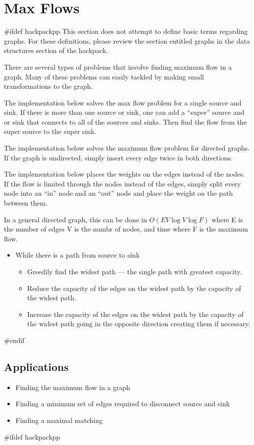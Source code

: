 \section{Max Flows}
#ifdef hackpackpp
This section does not attempt to define basic terms regarding graphs.
For these definitions, please review the section entitled graphs in the data structures section of the hackpack.


There are several types of problems that involve finding maximum flow in a graph.
Many of these problems can easily tackled by making small transformations to the graph.


The implementation below solves the max flow problem for a single source and sink.
If there is more than one source or sink, one can add a ``super'' source and or sink that connects to all of the sources and sinks.
Then find the flow from the super source to the super sink.


The implementation below solves the maximum flow problem for directed graphs.
If the graph is undirected, simply insert every edge twice in both directions.


The implementation below places the weights on the edges instead of the nodes.
If the flow is limited through the nodes instead of the edges, simply split every node into an ``in'' node and an ``out'' node and place the weight on the path between them.


In a general directed graph, this can be done in $O(EV \log V \log F)$ where E is the number of edges V is the numbr of nodes, and time where F is the maximum flow.
\begin{itemize}
	\item While there is a path from source to sink
	\begin{itemize}
		\item Greedily find the widest path --- the single path with greatest capacity.
		\item Reduce the capacity of the edges on the widest path by the capacity of the widest path.
		\item Increase the capacity of the edges on the widest path by the capacity of the widest path going in the opposite direction creating them if necessary.
	\end{itemize}
\end{itemize}

#endif

\subsection{Applications}
\begin{itemize}
	\item Finding the maximum flow in a graph
	\item Finding a minimum set of edges required to disconnect source and sink
	\item Finding a maximal matching
\end{itemize}
#ifdef hackpackpp

